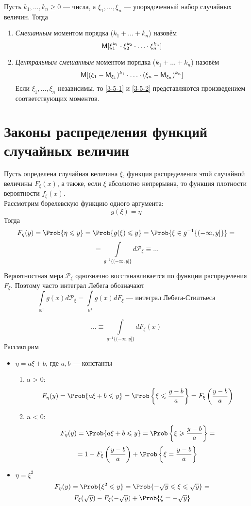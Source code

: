 \begin{definition}
  Пусть $k_1, \ldots, k_n \geqslant 0$ --- числа, а $\xi_1, \ldots, \xi_n$ --- упорядоченный набор случайных величин. Тогда
  \begin{enumerate}
    \item \label{3-5-1} \textit{Смешанным} моментом порядка ($k_1 + \ldots + k_n$) назовём
    \[
      \mathsf{M} [\xi_1^{k_1} \cdot \xi_2^{k_2} \cdot \ldots \cdot \xi_n^{k_n}]
    \]
    \item \label{3-5-2} \textit{Центральным смешанным} моментом порядка ($k_1 + \ldots + k_n$) назовём
    \[
      \mathsf{M} [(\xi_1 - \mathsf{M}_{\xi_1})^{k_1} \cdot \ldots \cdot (\xi_n - \mathsf{M}_{\xi_n})^{k_n}]
    \]
    Если $\xi_1, \ldots, \xi_n$ независимы, то \ref{3-5-1} и \ref{3-5-2} представляются произведением соответствующих моментов.
  \end{enumerate}
\end{definition}

\section{Законы распределения функций случайных величин}
Пусть определена случайная величина $\xi$, функция распределения этой случайной величины $F_{\xi}(x)$, а также, если $\xi$ абсолютно непрерывна, то функция плотности вероятности $f_{\xi}(x)$. \\
Рассмотрим борелевскую функцию одного аргумента:
\[
  g(\xi) = \eta
\]
Тогда
\[
  F_{\eta} (y) = \Prob \{ \eta \leqslant y \} = \Prob \{ g(\xi) \leqslant y \} = \Prob \{ \xi \in g^{-1} \{ (-\infty, y] \} \} =
\]
\[
  = \int\limits_{g^{-1} \{ (-\infty, y] \}} d \mathcal{P}_{\xi} \equiv \ldots
\]
\begin{addition}
  Вероятностная мера $\mathcal{P}_{\xi}$ однозначно восстанавливается по функции распределения $F_{\xi}$. Поэтому часто интеграл Лебега обозначают
  \[
    \int\limits_{\mathbb{R}^1} g(x) d \mathcal{P}_{\xi} = \int\limits_{\mathbb{R}^1} g(x) dF_{\xi} \text{ --- интеграл Лебега-Стилтьеса}
  \]
\end{addition}
\[
 \ldots \equiv \int\limits_{g^{-1} \{ (-\infty, y] \}} d F_{\xi} (x)
\]
Рассмотрим
\begin{itemize}
  \item $\eta = a \xi + b$, где $a, b$ --- константы
  \begin{enumerate}
    \item a > 0:
    \[
      F_{\eta} (y) = \Prob \{a \xi + b \leqslant y \} = \Prob \left\{ \xi \leqslant \frac{y-b}{a} \right\} = F_{\xi} \left( \frac{y-b}{a} \right)
    \]
    \item a < 0:
    \[
      F_{\eta} (y) = \Prob \{a \xi + b \leqslant y \} = \Prob \left\{ \xi \geqslant \frac{y-b}{a} \right\} =
    \]
    \[
      = 1 - F_{\xi} \left( \frac{y-b}{a}\right) + \Prob \left\{ \xi = \frac{y-b}{a} \right\}
    \]
  \end{enumerate}
  \item $\eta = \xi^2$
	\[
		F_{\eta}(y) =  \Prob \{\xi^2 \leqslant y \} = \Prob \{ -\sqrt{y} \leqslant \xi \leqslant \sqrt{y} \} =
	\]
	\[
		F_{\xi}(\sqrt{y})  - F_{\xi} (-\sqrt{ y }) + \Prob \{ \xi = -\sqrt{y} \}
	\]
\end{itemize}

